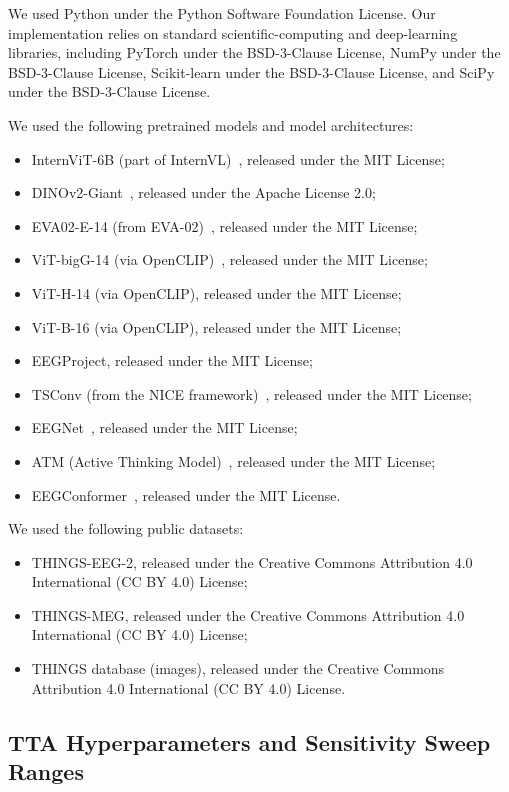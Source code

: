 \documentclass{article}
\begin{document}
We used Python under the Python Software Foundation License. Our implementation relies on standard scientific-computing and deep-learning
libraries, including PyTorch under the BSD-3-Clause License, NumPy under the BSD-3-Clause License, Scikit-learn under the BSD-3-Clause License, and SciPy under the BSD-3-Clause License. 

We used the following pretrained models and model architectures:
\begin{itemize}
  \item InternViT-6B (part of InternVL)~\cite{chen2024internvl}, released under the MIT License;
  \item DINOv2-Giant~\cite{oquab2024dinov2}, released under the Apache License 2.0;
  \item EVA02-E-14 (from EVA-02)~\cite{fang2023eva02}, released under the MIT License;
  \item ViT-bigG-14 (via OpenCLIP)~\cite{cherti2023openclip}, released under the MIT License;
  \item ViT-H-14 (via OpenCLIP), released under the MIT License;
  \item ViT-B-16 (via OpenCLIP), released under the MIT License;
  \item EEGProject, released under the MIT License;
  \item TSConv (from the NICE framework)~\cite{song2024nice}, released under the MIT License;
  \item EEGNet~\cite{lawhern2018eegnet}, released under the MIT License;
  \item ATM (Active Thinking Model)~\cite{li2024atm}, released under the MIT License;
  \item EEGConformer~\cite{song2023eegconformer}, released under the MIT License.
\end{itemize}

We used the following public datasets:
\begin{itemize}
  \item THINGS-EEG-2, released under the Creative Commons Attribution 4.0 International (CC BY 4.0) License;
  \item THINGS-MEG, released under the Creative Commons Attribution 4.0 International (CC BY 4.0) License;
  \item THINGS database (images), released under the Creative Commons Attribution 4.0 International (CC BY 4.0) License.
\end{itemize}

\subsection{TTA Hyperparameters and Sensitivity Sweep Ranges}
\label{app:hyperparameter-details}
\end{document}
